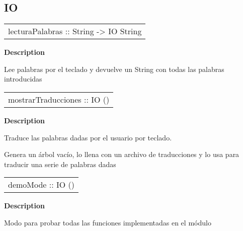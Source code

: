 \subsection{IO}
\begin{haddockdesc}
\item[\begin{tabular}{@{}l}
lecturaPalabras :: String -> IO String
\end{tabular}]
{\haddockbegindoc
\textbf{Description}\par
Lee palabras por el teclado y devuelve un String con todas las palabras introducidas\par}
\end{haddockdesc}
\begin{haddockdesc}
\item[\begin{tabular}{@{}l}
mostrarTraducciones :: IO ()
\end{tabular}]
{\haddockbegindoc
\textbf{Description}\par
Traduce las palabras dadas por el usuario por teclado.\par
Genera un árbol vacío, lo llena con un archivo de traducciones y lo usa para traducir una serie de palabras dadas\par}
\end{haddockdesc}
\begin{haddockdesc}
\item[\begin{tabular}{@{}l}
demoMode :: IO ()
\end{tabular}]
{\haddockbegindoc
\textbf{Description}\par
Modo para probar todas las funciones implementadas en el módulo\par}
\end{haddockdesc}